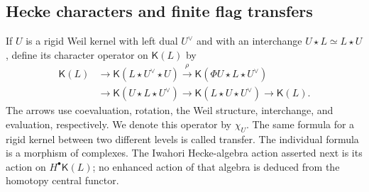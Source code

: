 \subsection{Hecke characters and finite flag transfers}

If $U$ is a rigid Weil kernel with left dual $U^\vee$ and with
an interchange $U\star L\simeq L\star U$, define its character
operator on $\mathsf K(L)$ by
\begin{equation}\label{cat:character}
\begin{split}
 \mathsf K(L)&\longrightarrow
 \mathsf K(L\star U^\vee\star U)
 \xrightarrow{\rho}
 \mathsf K(\Phi U\star L\star U^\vee)\\
 &\longrightarrow\mathsf K(U\star L\star U^\vee)
 \longrightarrow\mathsf K(L\star U\star U^\vee)
 \longrightarrow\mathsf K(L).
\end{split}
\end{equation}
The arrows use coevaluation, rotation, the Weil structure,
interchange, and evaluation, respectively. We denote this
operator by $\chi_U$. The same formula for a rigid kernel
between two different levels is called transfer.
The individual formula is a morphism of complexes. The Iwahori
Hecke-algebra action asserted next is its action on
$H^\bullet\mathsf K(L)$; no enhanced action of that algebra is
deduced from the homotopy central functor.

